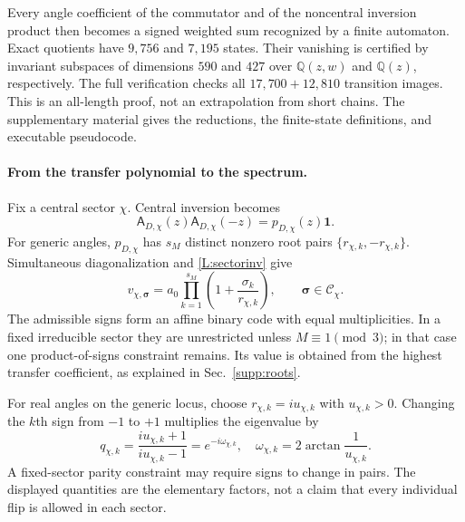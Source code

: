 \documentclass[10pt,letterpaper]{article}
\newcommand{\one}{\mathbf 1}
\newcommand{\cA}{\mathsf A}
\begin{document}
Every angle coefficient of the commutator and of the noncentral inversion product then becomes a signed weighted sum recognized by a finite automaton. Exact quotients have $9{,}756$ and $7{,}195$ states. Their vanishing is certified by invariant subspaces of dimensions $590$ and $427$ over $\mathbb Q(z,w)$ and $\mathbb Q(z)$, respectively. The full verification checks all $17{,}700+12{,}810$ transition images. This is an all-length proof, not an extrapolation from short chains. The supplementary material gives the reductions, the finite-state definitions, and executable pseudocode.

\paragraph{From the transfer polynomial to the spectrum.}
Fix a central sector $\chi$. Central inversion becomes
\begin{equation}\label{L:sectorinv}
 \cA_{D,\chi}(z)\cA_{D,\chi}(-z)=p_{D,\chi}(z)\one.
\end{equation}
For generic angles, $p_{D,\chi}$ has $s_M$ distinct nonzero root pairs $\{r_{\chi,k},-r_{\chi,k}\}$. Simultaneous diagonalization and \eqref{L:sectorinv} give
\begin{equation}\label{L:spectrum}
 \boxed{v_{\chi,\boldsymbol\sigma}
 =a_0\prod_{k=1}^{s_M}\left(1+\frac{\sigma_k}{r_{\chi,k}}\right),
 \qquad\boldsymbol\sigma\in\mathcal C_\chi.}
\end{equation}
The admissible signs form an affine binary code with equal multiplicities. In a fixed irreducible sector they are unrestricted unless $M\equiv1\pmod3$; in that case one product-of-signs constraint remains. Its value is obtained from the highest transfer coefficient, as explained in Sec.~\ref{supp:roots}.

For real angles on the generic locus, choose $r_{\chi,k}=iu_{\chi,k}$ with $u_{\chi,k}>0$. Changing the $k$th sign from $-1$ to $+1$ multiplies the eigenvalue by
\begin{equation}\label{L:phase}
 q_{\chi,k}=\frac{iu_{\chi,k}+1}{iu_{\chi,k}-1}
 =e^{-i\omega_{\chi,k}},\quad
 \omega_{\chi,k}=2\arctan\frac1{u_{\chi,k}}.
\end{equation}
A fixed-sector parity constraint may require signs to change in pairs. The displayed quantities are the elementary factors, not a claim that every individual flip is allowed in each sector.
\end{document}

